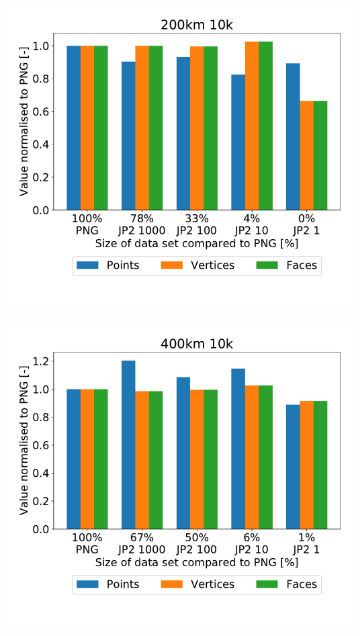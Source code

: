 \begin{figure}[htb]
\begin{subfigure}[b]{0.49\textwidth}
            \caption{}
            \label{fig:recon_120_100_10}
        \end{subfigure}
        \\
        \begin{subfigure}[b]{0.49\textwidth}
            \centering
            \includegraphics[width=\textwidth]{doc/thesis/0_figures/recon/200km_10k}
            \caption{}
            \label{fig:recon_120_200_10}
        \end{subfigure}
        \begin{subfigure}[b]{0.49\textwidth}
            \centering
            \includegraphics[width=\textwidth]{doc/thesis/0_figures/recon/400km_10k}

\end{subfigure}
\end{figure}
